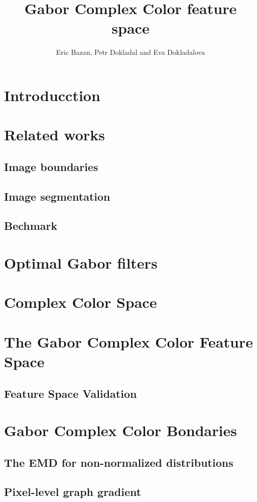 \documentclass[11pt,a4paper,onecolumn]{article}
\author{Eric Bazan, Petr Dokladal and Eva Dokladalova}
\title{Gabor Complex Color feature space}
\begin{document}
\maketitle

\section{Introducction}

\section{Related works}
\subsection{Image boundaries}
\subsection{Image segmentation}
\subsection{Bechmark}

\section{Optimal Gabor filters}

\section{Complex Color Space}

\section{The Gabor Complex Color Feature Space}
\subsection{Feature Space Validation}

\section{Gabor Complex Color Bondaries}
\subsection{The EMD for non-normalized distributions}
\subsection{Pixel-level graph gradient}
\end{document}
